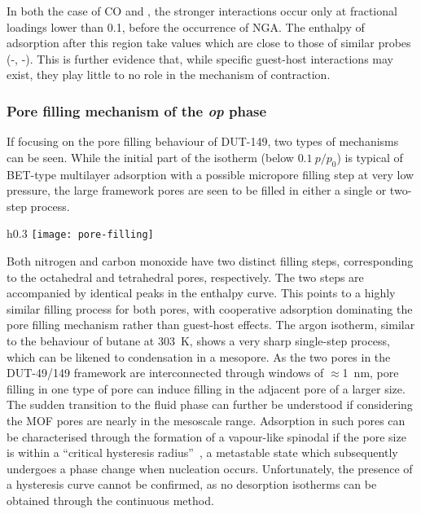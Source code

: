 In both the case of CO and , the 
stronger interactions occur only at fractional loadings lower
than 0.1, before the occurrence of NGA. The enthalpy of 
adsorption after this region take values which are close to
those of similar probes (-, -).
This is further evidence that, while specific guest-host interactions
may exist, they play little to no role in the mechanism of contraction.

\subsubsection{Pore filling mechanism of the \textit{op} phase}

If focusing on the pore filling behaviour of DUT-149, two types
of mechanisms can be seen. While the initial part of the isotherm 
(below \(0.1~p/p_0\)) is typical of BET-type multilayer adsorption
with a possible micropore filling step at very low pressure,
the large framework pores are seen to be filled in either a single or
two-step process.
\begin{wrapfigure}{h}{0.3\textwidth}
	\centering
	\texttt{[image: pore-filling]}%
    \caption{A dissection of the  isotherm
    at \SI{111}{\kelvin} 
    in components of adsorption in each type of pore.}%
	\label{dut:fgr:pore-filling}
\end{wrapfigure}
Both nitrogen and carbon monoxide have two distinct filling
steps, corresponding to the octahedral and tetrahedral pores,
respectively. The two steps are accompanied by identical 
peaks in the enthalpy curve. This points to a highly similar 
filling process for both pores, with cooperative adsorption
dominating the pore filling mechanism rather than guest-host 
effects. The argon isotherm, similar to the behaviour of 
butane at \SI{303}{\kelvin}, shows a very sharp single-step process,
which can be likened to condensation in a mesopore. As the 
two pores in the DUT-49/149 framework are interconnected through 
windows of \(\approx\)\SI{1}{\nano\metre}, pore filling 
in one type of pore can induce filling in the adjacent pore of 
a larger size. The sudden transition to the fluid phase can further
be understood if considering the MOF pores are nearly in the mesoscale 
range. Adsorption in such pores can be characterised through 
the formation of a vapour-like spinodal if the pore size is within
a ``critical hysteresis radius''~\cite{hiratsukaCriticalEnergyBarrier2016},
a metastable state which subsequently undergoes a phase change when
nucleation occurs. Unfortunately, the presence of a hysteresis curve
cannot be confirmed, as no desorption isotherms can be obtained 
through the continuous method.

